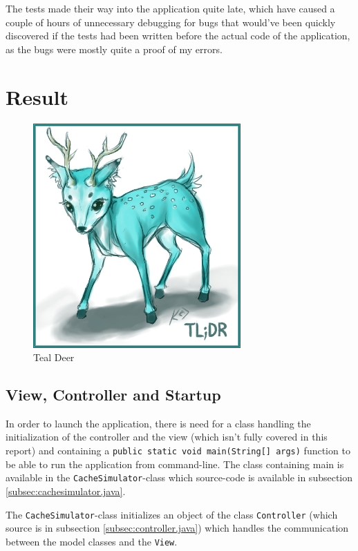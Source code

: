 \documentclass[a4paper]{scrreprt}
\begin{document}
The tests made their way into the application quite late, which have caused a couple of hours of unnecessary debugging for bugs that would've been quickly discovered if the tests had been written before the actual code of the application, as the bugs were mostly quite a proof of my errors.

\chapter{Result}
\label{sec:result}

\begin{figure}[h]
  \begin{center}
    \includegraphics[scale=.5]{tldr.jpg}
    \caption{Teal Deer}
    \label{fig:sd}
  \end{center}
\end{figure}

\section{View, Controller and Startup}
\label{sec:sup}

In order to launch the application, there is need for a class handling the initialization of the controller and the view (which isn't fully covered in this report) and containing a \texttt{public static void main(String[] args)} function to be able to run the application from command-line. The class containing main is available in the \texttt{CacheSimulator}-class which source-code is available in subsection \ref{subsec:cachesimulator.java}.

The \texttt{CacheSimulator}-class initializes an object of the class \texttt{Controller} (which source is in subsection \ref{subsec:controller.java}) which handles the communication between the model classes and the \texttt{View}.
\end{document}
